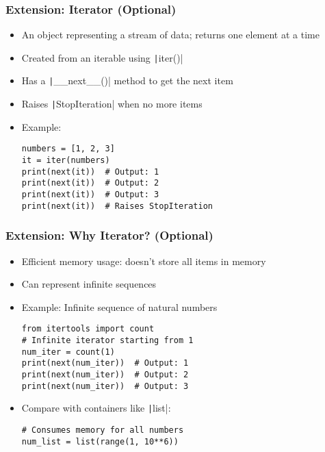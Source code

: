 \documentclass{beamer}
\begin{document}
\begin{frame}[fragile]
    \frametitle{Extension: Iterator (Optional)}
    \begin{itemize}
        \item An object representing a stream of data; returns one element at a time
        \item Created from an iterable using \texttt|iter()|
        \item Has a \texttt|__next__()| method to get the next item
        \item Raises \texttt|StopIteration| when no more items
        \item Example:
              \begin{verbatim}
numbers = [1, 2, 3]
it = iter(numbers)
print(next(it))  # Output: 1
print(next(it))  # Output: 2
print(next(it))  # Output: 3
print(next(it))  # Raises StopIteration
              \end{verbatim}
    \end{itemize}
\end{frame}

\begin{frame}[fragile]
    \frametitle{Extension: Why Iterator? (Optional)}
    \begin{itemize}
        \item Efficient memory usage: doesn't store all items in memory
        \item Can represent infinite sequences
        \item Example: Infinite sequence of natural numbers
              \begin{verbatim}
from itertools import count
# Infinite iterator starting from 1
num_iter = count(1)
print(next(num_iter))  # Output: 1
print(next(num_iter))  # Output: 2
print(next(num_iter))  # Output: 3
              \end{verbatim}
        \item Compare with containers like \texttt|list|:
              \begin{verbatim}
# Consumes memory for all numbers
num_list = list(range(1, 10**6))
              \end{verbatim}
    \end{itemize}
\end{frame}
\end{document}
